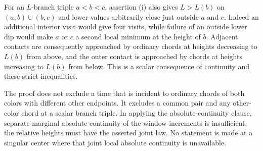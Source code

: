 \begin{remark}
\label{arm:generic-chords-scope}
For an $L$-branch triple $a<b<c$, assertion (i) also gives
$L>L(b)$ on $(a,b)\cup(b,c)$ and lower values arbitrarily close just
outside $a$ and $c$.  Indeed an additional interior visit would give
four visits, while failure of an outside lower dip would make $a$ or
$c$ a second local minimum at the height of $b$.  Adjacent contacts
are consequently approached by ordinary chords at heights decreasing
to $L(b)$ from above, and the outer contact is approached by chords
at heights increasing to $L(b)$ from below.  This is a scalar consequence
of continuity and these strict inequalities.

The proof does not exclude a time that is incident to ordinary chords
of both colors with different other endpoints.  It excludes a common
pair and any other-color chord at a scalar branch triple.  In applying
the absolute-continuity clause, separate marginal absolute continuity
of the window increments is insufficient: the relative heights must
have the asserted joint law.  No statement is made at a singular center
where that joint local absolute continuity is unavailable.
\end{remark}
